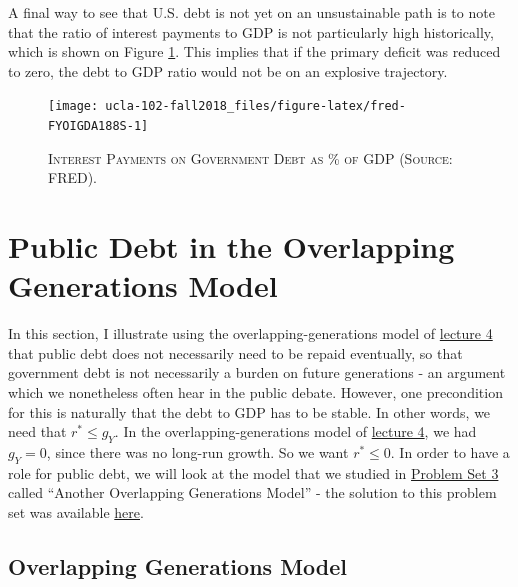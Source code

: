 \documentclass[]{book}
\theoremstyle{definition}
\theoremstyle{definition}
\theoremstyle{definition}
\theoremstyle{remark}
\begin{document}
A final way to see that U.S. debt is not yet on an unsustainable path is
to note that the ratio of interest payments to GDP is not particularly
high historically, which is shown on Figure \ref{fig:fred-FYOIGDA188S}.
This implies that if the primary deficit was reduced to zero, the debt
to GDP ratio would not be on an explosive trajectory.




\begin{figure}

{\centering \texttt{[image: ucla-102-fall2018\_files/figure-latex/fred-FYOIGDA188S-1]} 

}

\caption{\textsc{Interest Payments on Government Debt as
\% of GDP (Source: FRED).}}\label{fig:fred-FYOIGDA188S}
\end{figure}

\section{Public Debt in the Overlapping Generations
Model}\label{public-debt-in-the-overlapping-generations-model}

In this section, I illustrate using the overlapping-generations model of
\protect\hyperlink{olg}{lecture 4} that public debt does not necessarily
need to be repaid eventually, so that government debt is not necessarily
a burden on future generations - an argument which we nonetheless often
hear in the public debate. However, one precondition for this is
naturally that the debt to GDP has to be stable. In other words, we need
that \(r^{*} \leq g_Y\). In the overlapping-generations model of
\protect\hyperlink{olg}{lecture 4}, we had \(g_Y = 0\), since there was
no long-run growth. So we want \(r^{*} \leq 0\). In order to have a role
for public debt, we will look at the model that we studied in
\href{pset3.html}{Problem Set 3} called ``Another Overlapping
Generations Model'' - the solution to this problem set was available
\href{pset3-sol.html}{here}.

\subsection{Overlapping Generations
Model}\label{overlapping-generations-model}
\end{document}
